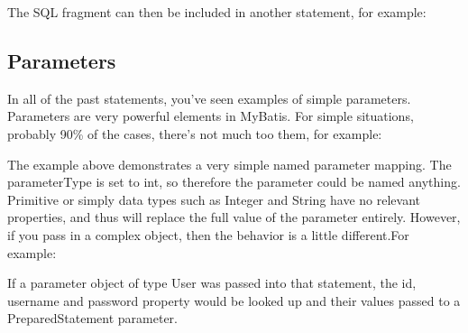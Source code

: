 The SQL fragment can then be included in another statement, for example:


\subsection{Parameters}
In all of the past statements, you've seen examples of simple parameters. Parameters are very powerful elements in MyBatis. For simple situations, probably 90\% of the cases, there's not much too them, for example:



The example above demonstrates a very simple named parameter mapping. The parameterType is set to int, so therefore the parameter could be named anything. Primitive or simply data types such as Integer and String have no relevant properties, and thus will replace the full value of the parameter entirely. However, if you pass in a complex object, then the behavior is a little different.For example:



If a parameter object of type User was passed into that statement, the id, username and password property would be looked up and their values passed to a PreparedStatement parameter.